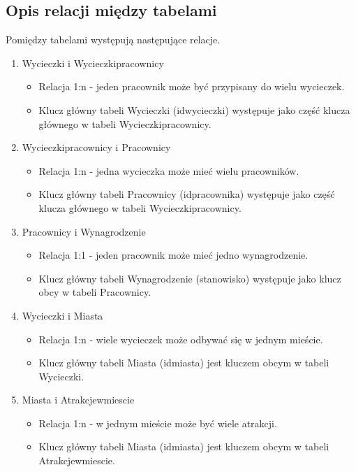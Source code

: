 \documentclass{article}
\begin{document}
	\subsection{Opis relacji między tabelami}
	
	Pomiędzy tabelami występują następujące relacje.
	
	\begin{enumerate}
		
		\item Wycieczki i Wycieczki\textunderscore pracownicy
		\begin{itemize}
			\item Relacja 1:n - jeden pracownik może być przypisany do wielu wycieczek.
			\item Klucz główny tabeli Wycieczki (id\textunderscore wycieczki) występuje jako część klucza głównego w tabeli Wycieczki\textunderscore pracownicy.
		\end{itemize}
		 
		\item Wycieczki\textunderscore pracownicy i Pracownicy
		\begin{itemize}
			\item Relacja 1:n - jedna wycieczka może mieć wielu pracowników.
			\item Klucz główny tabeli Pracownicy (id\textunderscore pracownika) występuje jako część klucza głównego w tabeli Wycieczki\textunderscore pracownicy.
		\end{itemize}
	
		\item Pracownicy i Wynagrodzenie
		\begin{itemize}
			\item Relacja 1:1 - jeden pracownik może mieć jedno wynagrodzenie.
			\item Klucz główny tabeli Wynagrodzenie (stanowisko) występuje jako klucz obcy w tabeli Pracownicy.
		\end{itemize}

		\item Wycieczki i Miasta
		\begin{itemize}
			\item Relacja 1:n - wiele wycieczek może odbywać się w jednym mieście.
			\item Klucz główny tabeli Miasta (id\textunderscore miasta) jest kluczem obcym w tabeli Wycieczki.
		\end{itemize}
		
		\item Miasta i Atrakcje\textunderscore w\textunderscore miescie
		\begin{itemize}
			\item Relacja 1:n - w jednym mieście może być wiele atrakcji.
			\item Klucz główny tabeli Miasta (id\textunderscore miasta) jest kluczem obcym w tabeli Atrakcje\textunderscore w\textunderscore miescie.
		\end{itemize}
		

\end{enumerate}
\end{document}
